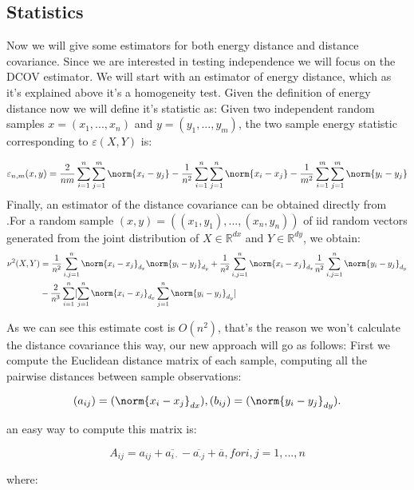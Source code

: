 \subsection{Statistics}
Now we will give some estimators for both energy distance and distance covariance. Since we are interested in testing independence we will focus on the DCOV estimator. We will start with an estimator of energy distance, which as it's explained above it's a homogeneity test.
Given the definition of energy distance \cite{energy_distance} now we will define it's statistic as: Given two independent random samples $x = (x_{1},...,x_{n})$ and  $y = (y_{1},...,y_{m})$, the two sample energy statistic corresponding to $\varepsilon(X,Y)$ is:

$$
\varepsilon_{n,m}(x,y) = \frac{2}{nm}\sum_{i=1}^{n}\sum_{j=1}^{m}\norm{x_{i}-y_{j}} - \frac{1}{n^{2}}\sum_{i=1}^{n}\sum_{j=1}^{n}\norm{x_{i}-x_{j}}- \frac{1}{m^{2}}\sum_{i=1}^{m}\sum_{j=1}^{m}\norm{y_{i}-y_{j}}
$$
Finally, an estimator of the distance covariance can be obtained directly from \cite{DCOV}.For a random sample $(x,y) = ((x_{1},y_{1}),...,(x_{n},y_{n}))$ of iid random vectors generated from the joint distribution of $X \in \mathbb{R}^{dx}$ and $Y \in \mathbb{R}^{dy}$, we obtain:
\begin{equation}{}
\begin{split}
\nu^{2}(X,Y)  
&= \frac{1}{n^{2}}\sum_{i,j=1}^{n}\norm{x_{i}-x_{j}}_{d_{x}}\norm{y_{i}-y_{j}}_{d_{y}} + \frac{1}{n^{2}}\sum_{i,j=1}^{n}\norm{x_{i}-x_{j}}_{d_{x}}\frac{1}{n^{2}}\sum_{i,j=1}^{n}\norm{y_{i}-y_{j}}_{d_{y}}\\
& -\frac{2}{n^{3}}\sum_{i=1}^{n}[\sum_{j=1}^{n}\norm{x_{i}-x_{j}}_{d_{x}}\sum_{j=1}^{n}\norm{y_{i}-y_{j}}_{d_{y}}]
\end{split}
\end{equation} 

As we can see this estimate cost is $O(n^{2})$, that's the reason we won't calculate the distance covariance this way, our new approach will go as follows:
First we compute the Euclidean distance matrix of each sample, computing all the pairwise distances between sample observations:

$$(a_{ij}) = (\norm{x_{i}-x_{j}}_{dx}), (b_{ij}) = (\norm{y_{i}-y_{j}}_{dy}).$$

an easy way to compute this matrix is:

$$A_{ij} = a_{ij} + \overline{a_{i \cdot}} - \overline{a_{\cdot j}} + \overline{a}, for i,j = 1,...,n$$

where:

